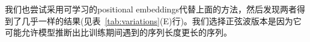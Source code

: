 
我们也尝试采用可学习的positional embeddings\citep{JonasFaceNet2017}代替上面的方法，然后发现两者得到了几乎一样的结果(见表~\ref{tab:variations}(E)行)。我们选择正弦波版本是因为它可能允许模型推断出比训练期间遇到的序列长度更长的序列。